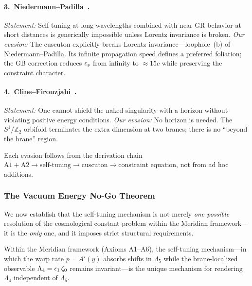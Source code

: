 \paragraph{3.\ Niedermann--Padilla~\cite{ch1:niedermann-padilla}.}
\emph{Statement:} Self-tuning at long wavelengths combined with near-GR behavior at short distances is generically impossible unless Lorentz invariance is broken. \emph{Our evasion:} The cuscuton explicitly breaks Lorentz invariance---loophole~(b) of Niedermann--Padilla. Its infinite propagation speed defines a preferred foliation; the GB correction reduces $c_s$ from infinity to $\approx 15c$ while preserving the constraint character.

\paragraph{4.\ Cline--Firouzjahi~\cite{ch1:cline-firouzjahi}.}
\emph{Statement:} One cannot shield the naked singularity with a horizon without violating positive energy conditions. \emph{Our evasion:} No horizon is needed. The $S^1/\mathbb{Z}_2$ orbifold terminates the extra dimension at two branes; there is no ``beyond the brane'' region.

\medskip

Each evasion follows from the derivation chain $\mathrm{A1} + \mathrm{A2} \to \text{self-tuning} \to \text{cuscuton} \to \text{constraint equation}$, not from ad hoc additions.

\subsubsection{The Vacuum Energy No-Go Theorem}
\label{sec:1-nogo-formal}

We now establish that the self-tuning mechanism is not merely \emph{one possible} resolution of the cosmological constant problem within the Meridian framework---it is the \emph{only} one, and it imposes strict structural requirements.

\begin{claim}
\label{thm:1-uniqueness}
Within the Meridian framework (Axioms A1--A6), the self-tuning mechanism---in which the warp rate $p = A'(y)$ absorbs shifts in $\Lambda_5$ while the brane-localized observable $\Lambda_4 = \epsilon_1\,\zeta_0$ remains invariant---is the unique mechanism for rendering $\Lambda_4$ independent of $\Lambda_5$.
\end{claim}

